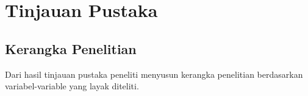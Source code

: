 \documentclass[12pt,oneside]{udthesis}
\begin{document}
\begin{comment}
\draw [arrow] (ltr) -- (rum);
\draw [arrow] (rum) -- (tuj);
\draw [arrow] (tuj) -- (pus);

\draw [arrow] (pus) -| (kaj);
\draw [arrow] (pus) -| (kaj2);

\draw [doublearrow] (kaj) -- (kaj2);

\draw [arrow] (kaj) |- (met);
\draw [dotted] (kaj) |- (hip);

\draw [arrow] (kaj2) |- (met);
\draw [dotted] (kaj2) |- (hip);

\draw [arrow] (met) -- (ana);
\draw [arrow] (ana) -- (tem);

\draw [arrow] (tem) -- (kes);

\end{tikzpicture}
\caption{Alur Pikir}
\end{figure}
\end{comment}
\newpage

\chapter{Tinjauan Pustaka}\label{chap:pstk}

\lipsum[2-4]

\section{Kerangka Penelitian}


Dari hasil tinjauan pustaka peneliti menyusun kerangka penelitian berdasarkan variabel-variable yang layak diteliti.
\end{document}
